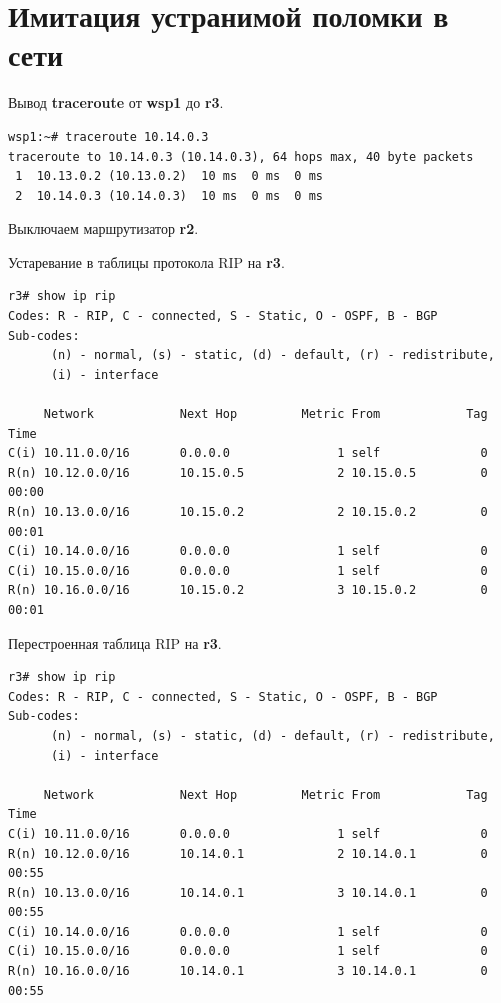 \documentclass[a4paper,12pt]{article}
\begin{document}
\section{Имитация устранимой поломки в сети}

Вывод \textbf{traceroute} от \textbf{wsp1} до \textbf{r3}.

\begin{Verbatim}
wsp1:~# traceroute 10.14.0.3
traceroute to 10.14.0.3 (10.14.0.3), 64 hops max, 40 byte packets
 1  10.13.0.2 (10.13.0.2)  10 ms  0 ms  0 ms
 2  10.14.0.3 (10.14.0.3)  10 ms  0 ms  0 ms
\end{Verbatim}

Выключаем маршрутизатор \textbf{r2}.

Устаревание в таблицы протокола RIP на \textbf{r3}.

\begin{Verbatim}
r3# show ip rip
Codes: R - RIP, C - connected, S - Static, O - OSPF, B - BGP
Sub-codes:
      (n) - normal, (s) - static, (d) - default, (r) - redistribute,
      (i) - interface

     Network            Next Hop         Metric From            Tag Time
C(i) 10.11.0.0/16       0.0.0.0               1 self              0
R(n) 10.12.0.0/16       10.15.0.5             2 10.15.0.5         0 00:00
R(n) 10.13.0.0/16       10.15.0.2             2 10.15.0.2         0 00:01
C(i) 10.14.0.0/16       0.0.0.0               1 self              0
C(i) 10.15.0.0/16       0.0.0.0               1 self              0
R(n) 10.16.0.0/16       10.15.0.2             3 10.15.0.2         0 00:01
\end{Verbatim}

Перестроенная таблица RIP на \textbf{r3}.

\begin{Verbatim}
r3# show ip rip
Codes: R - RIP, C - connected, S - Static, O - OSPF, B - BGP
Sub-codes:
      (n) - normal, (s) - static, (d) - default, (r) - redistribute,
      (i) - interface

     Network            Next Hop         Metric From            Tag Time
C(i) 10.11.0.0/16       0.0.0.0               1 self              0
R(n) 10.12.0.0/16       10.14.0.1             2 10.14.0.1         0 00:55
R(n) 10.13.0.0/16       10.14.0.1             3 10.14.0.1         0 00:55
C(i) 10.14.0.0/16       0.0.0.0               1 self              0
C(i) 10.15.0.0/16       0.0.0.0               1 self              0
R(n) 10.16.0.0/16       10.14.0.1             3 10.14.0.1         0 00:55
\end{Verbatim}
\end{document}
